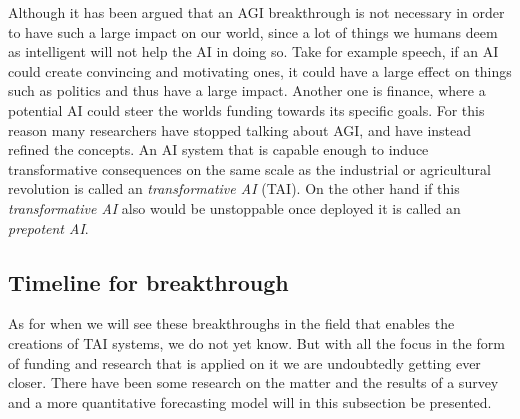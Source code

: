 \documentclass[12pt,A4]{report}
\theoremstyle{definition}
\begin{document}
Although it has been argued that an AGI breakthrough is not necessary in order to have such a large impact on our world, since a lot of things we humans deem as intelligent will not help the AI in doing so. Take for example speech, if an AI could create convincing and motivating ones, it could have a large effect on things such as politics and thus have a large impact. Another one is finance, where a potential AI could steer the worlds funding towards its specific goals. For this reason many researchers have stopped talking about AGI, and have instead refined the concepts. An AI system that is capable enough to induce transformative consequences on the same scale as the industrial or agricultural revolution is called an \textit{transformative AI} (TAI). On the other hand if this \textit{transformative AI} also would be unstoppable once deployed it is called an \textit{prepotent AI}. 


\subsection{Timeline for breakthrough}
As for when we will see these breakthroughs in the field that enables the creations of TAI systems, we do not yet know. But with all the focus in the form of funding and research that is applied on it we are undoubtedly getting ever closer. There have been some research on the matter and the results of a survey and a more quantitative forecasting model will in this subsection be presented. %
\end{document}
